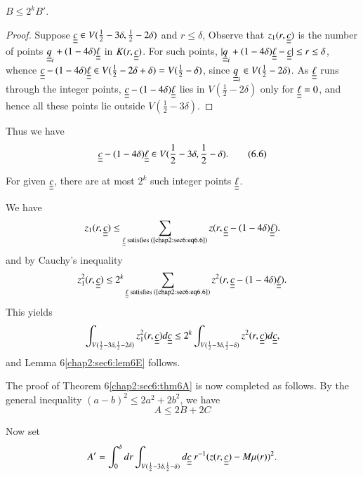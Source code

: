 \begin{lemma}\label{chap2:sec6:lem6E}
$B \leq 2^{k} B'$.
\end{lemma}

\begin{proof}
Suppose $\underline{\underline{c}} \in V (\frac{1}{2} - 3\delta, \frac{1}{2} - 2\delta)$ and $r \leq \delta$, Observe that $z_{1} (r, \underline{\underline{c}})$ is the number of points $\underline{\underline{q}}_{i} + (1-4\delta)\underline{\underline{\ell}}$ in $K(r, \underline{\underline{c}})$. For such points, $|\underline{\underline{q}}_{i} + (1-4\delta)\underline{\underline{\ell}} - \underline{\underline{c}}| \leq r \leq \delta$, whence $\underline{\underline{c}} - (1-4\delta)\underline{\underline{\ell}} \in V (\frac{1}{2} - 2\delta + \delta) = V(\frac{1}{2} - \delta)$, since $\underline{\underline{q}}_{i} \in V(\frac{1}{2} - 2\delta)$. As $\underline{\underline{\ell}}$ runs through the integer points, $\underline{\underline{c}} - (1-4\delta)\underline{\underline{\ell}}$ lies in $V \left(\frac{1}{2} - 2\delta\right)$ only for $\underline{\underline{\ell}} = 0$, and hence all these points lie outside $V \left(\frac{1}{2} - 3\delta\right)$. 
\end{proof}

Thus we have
\begin{equation*}
\underline{\underline{c}} - (1-4\delta) \underline{\underline{\ell}} \in V(\frac{1}{2} - 3\delta, \frac{1}{2} - \delta).\tag{6.6}\label{chap2:sec6:eq6.6}
\end{equation*}

For given $\underline{\underline{c}}$, there are at most $2^{k}$ such integer points $\underline{\underline{\ell}}$.

We have
$$
z_{1} (r, \underline{\underline{c}}) \leq \sum_{\underline{\underline{\ell}} \text{ satisfies (\ref{chap2:sec6:eq6.6})}} z(r, \underline{\underline{c}} -(1-4\delta)\underline{\underline{\ell}}).
$$\pageoriginale
and by Cauchy's inequality
$$
z_{1}^{2} (r, \underline{\underline{c}}) \leq 2^{k} \sum_{\underline{\underline{\ell}} \text{ satisfies (\ref{chap2:sec6:eq6.6})}} z^{2}(r, \underline{\underline{c}} -(1-4\delta)\underline{\underline{\ell}}).
$$
This yields
\begin{equation*}
\int_{V(\frac{1}{2} -3\delta, \frac{1}{2} -2\delta)} z_{1}^{2} (r, \underline{\underline{c}}) d\underline{\underline{c}} \leq 2^{k} \int_{V(\frac{1}{2} - 3\delta, \frac{1}{2} -\delta)} z^{2} (r, \underline{\underline{c}}) d\underline{\underline{c}},
\end{equation*}
and Lemma 6\ref{chap2:sec6:lem6E} follows.

The proof of Theorem 6\ref{chap2:sec6:thm6A} is now completed as follows. By the general inequality $(a-b)^{2} \leq 2a^{2} + 2b^{2}$, we have
\begin{equation*}
A \leq 2B + 2C\tag{6.7}\label{chap2:sec6:eq6.7}
\end{equation*}

Now set
\begin{equation*}
A' = \int_{0}^{\delta} dr \int_{V(\frac{1}{2} - 3\delta, \frac{1}{2} - \delta)} d\underline{\underline{c}}~ r^{-1} (z(r, \underline{\underline{c}}) -M\mu(r))^{2}.
\end{equation*}

